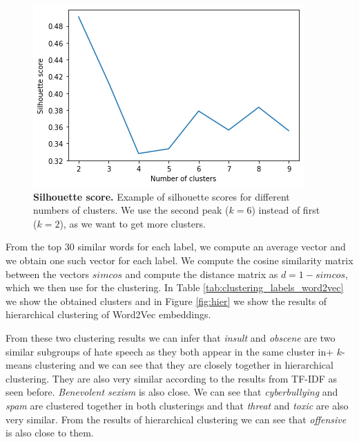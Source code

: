 \documentclass[fleqn,moreauthors,10pt]{ds_report}
\begin{document}
\begin{figure}[htb]\centering
	\includegraphics[width=\linewidth]{silh.png}
	\caption{\textbf{Silhouette score.} Example of silhouette scores for different numbers of clusters. We use the second peak ($k = 6$) instead of first ($k = 2$), as we want to get more clusters.}
	\label{fig:silh}
\end{figure}

From the top 30 similar words for each label, we compute an average vector and we obtain one such vector for each label. We compute the cosine similarity matrix between the vectors $simcos$ and compute the distance matrix as $d = 1 - simcos$, which we then use for the clustering. In Table \ref{tab:clustering_labels_word2vec} we show the obtained clusters and in Figure \ref{fig:hier} we show the results of hierarchical clustering of Word2Vec embeddings.

From these two clustering results we can infer that \textit{insult} and \textit{obscene} are two similar subgroups of hate speech as they both appear in the same cluster in+ $k$-means clustering and we can see that they are closely together in hierarchical clustering. They are also very similar according to the results from TF-IDF as seen before. \textit{Benevolent sexism} is also close. We can see that \textit{cyberbullying} and \textit{spam} are clustered together in both clusterings and that \textit{threat} and \textit{toxic} are also very similar. From the results of hierarchical clustering we can see that \textit{offensive} is also close to them.
\end{document}
